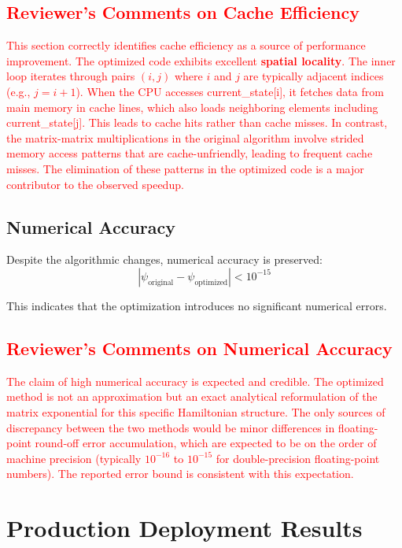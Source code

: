 \documentclass[11pt,a4paper]{article}
\begin{document}
\textcolor{red}{
\subsection*{Reviewer's Comments on Cache Efficiency}
This section correctly identifies cache efficiency as a source of performance improvement. The optimized code exhibits excellent \textbf{spatial locality}. The inner loop iterates through pairs $(i,j)$ where $i$ and $j$ are typically adjacent indices (e.g., $j = i+1$). When the CPU accesses current\_state[i], it fetches data from main memory in cache lines, which also loads neighboring elements including current\_state[j]. This leads to cache hits rather than cache misses. In contrast, the matrix-matrix multiplications in the original algorithm involve strided memory access patterns that are cache-unfriendly, leading to frequent cache misses. The elimination of these patterns in the optimized code is a major contributor to the observed speedup.
}

\subsection{Numerical Accuracy}

Despite the algorithmic changes, numerical accuracy is preserved:
\begin{equation}
|\psi_{\text{original}} - \psi_{\text{optimized}}| < 10^{-15}
\end{equation}

This indicates that the optimization introduces no significant numerical errors.

\textcolor{red}{
\subsection*{Reviewer's Comments on Numerical Accuracy}
The claim of high numerical accuracy is expected and credible. The optimized method is not an approximation but an exact analytical reformulation of the matrix exponential for this specific Hamiltonian structure. The only sources of discrepancy between the two methods would be minor differences in floating-point round-off error accumulation, which are expected to be on the order of machine precision (typically $10^{-16}$ to $10^{-15}$ for double-precision floating-point numbers). The reported error bound is consistent with this expectation.
}

\section{Production Deployment Results}
\end{document}
